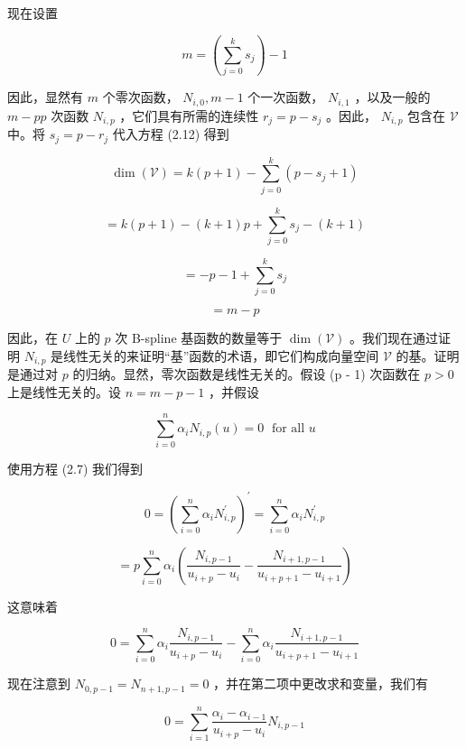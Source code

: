 \documentclass[../main.tex]{subfiles}
\begin{document}
现在设置

\[
m = \left( {\mathop{\sum }\limits_{{j = 0}}^{k}{s}_{j}}\right)  - 1
\]



因此，显然有 \(m\) 个零次函数， \({N}_{i,0},m - 1\) 个一次函数， \({N}_{i,1}\) ，以及一般的 \(m - {pp}\) 次函数 \({N}_{i,p}\) ，它们具有所需的连续性 \({r}_{j} = p - {s}_{j}\) 。因此， \({N}_{i,p}\) 包含在 \(\mathcal{V}\) 中。将 \({s}_{j} = p - {r}_{j}\) 代入方程 (2.12) 得到

\[
\dim \left( \mathcal{V}\right)  = k\left( {p + 1}\right)  - \mathop{\sum }\limits_{{j = 0}}^{k}\left( {p - {s}_{j} + 1}\right)
\]

\[
= k\left( {p + 1}\right)  - \left( {k + 1}\right) p + \mathop{\sum }\limits_{{j = 0}}^{k}{s}_{j} - \left( {k + 1}\right)
\]

\[
=  - p - 1 + \mathop{\sum }\limits_{{j = 0}}^{k}{s}_{j}
\]

\[
= m - p
\]

因此，在 \(U\) 上的 \(p\) 次 B-spline 基函数的数量等于 \(\dim \left( \mathcal{V}\right)\) 。我们现在通过证明 \({N}_{i,p}\) 是线性无关的来证明“基”函数的术语，即它们构成向量空间 \(\mathcal{V}\) 的基。证明是通过对 \(p\) 的归纳。显然，零次函数是线性无关的。假设 (p - 1) 次函数在 \(p > 0\) 上是线性无关的。设 \(n = m - p - 1\) ，并假设

\[
\mathop{\sum }\limits_{{i = 0}}^{n}{\alpha }_{i}{N}_{i,p}\left( u\right)  = 0\;\text{ for all }u
\]

使用方程 (2.7) 我们得到

\[
0 = {\left( \mathop{\sum }\limits_{{i = 0}}^{n}{\alpha }_{i}{N}_{i,p}^{\prime }\right) }^{\prime } = \mathop{\sum }\limits_{{i = 0}}^{n}{\alpha }_{i}{N}_{i,p}^{\prime }
\]

\[
= p\mathop{\sum }\limits_{{i = 0}}^{n}{\alpha }_{i}\left( {\frac{{N}_{i,p - 1}}{{u}_{i + p} - {u}_{i}} - \frac{{N}_{i + 1,p - 1}}{{u}_{i + p + 1} - {u}_{i + 1}}}\right)
\]

这意味着

\[
0 = \mathop{\sum }\limits_{{i = 0}}^{n}{\alpha }_{i}\frac{{N}_{i,p - 1}}{{u}_{i + p} - {u}_{i}} - \mathop{\sum }\limits_{{i = 0}}^{n}{\alpha }_{i}\frac{{N}_{i + 1,p - 1}}{{u}_{i + p + 1} - {u}_{i + 1}}
\]

现在注意到 \({N}_{0,p - 1} = {N}_{n + 1,p - 1} = 0\) ，并在第二项中更改求和变量，我们有

\[
0 = \mathop{\sum }\limits_{{i = 1}}^{n}\frac{{\alpha }_{i} - {\alpha }_{i - 1}}{{u}_{i + p} - {u}_{i}}{N}_{i,p - 1}
\]
\end{document}
